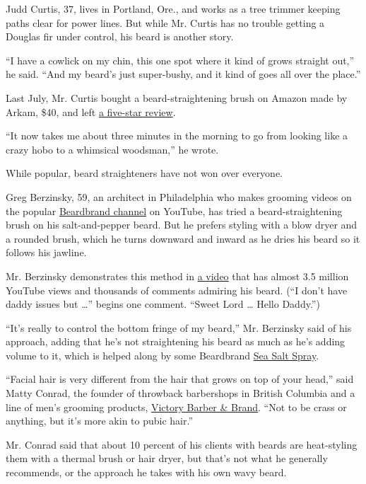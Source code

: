 Judd Curtis, 37, lives in Portland, Ore., and works as a tree trimmer
keeping paths clear for power lines. But while Mr. Curtis has no trouble
getting a Douglas fir under control, his beard is another story.

``I have a cowlick on my chin, this one spot where it kind of grows
straight out,'' he said. ``And my beard's just super-bushy, and it kind
of goes all over the place.''

Last July, Mr. Curtis bought a beard-straightening brush on Amazon made
by Arkam, \$40, and left
\href{https://www.amazon.com/gp/customer-reviews/R37IKYCPAE9X8W/ref=cm_cr_getr_d_rvw_ttl?ie=UTF8\&ASIN=B07Q5C9645}{a
five-star review}.

``It now takes me about three minutes in the morning to go from looking
like a crazy hobo to a whimsical woodsman,'' he wrote.

While popular, beard straighteners have not won over everyone.

Greg Berzinsky, 59, an architect in Philadelphia who makes grooming
videos on the popular
\href{https://www.youtube.com/user/TheBeardbrand/featured}{Beardbrand
channel} on YouTube, has tried a beard-straightening brush on his
salt-and-pepper beard. But he prefers styling with a blow dryer and a
rounded brush, which he turns downward and inward as he dries his beard
so it follows his jawline.

Mr. Berzinsky demonstrates this method in
\href{https://www.youtube.com/watch?v=qu5PxhEUMfU\&t=244s}{a video} that
has almost 3.5 million YouTube views and thousands of comments admiring
his beard. (``I don't have daddy issues but \ldots{}'' begins one
comment. ``Sweet Lord \ldots{} Hello Daddy.'')

``It's really to control the bottom fringe of my beard,'' Mr. Berzinsky
said of his approach, adding that he's not straightening his beard as
much as he's adding volume to it, which is helped along by some
Beardbrand \href{https://www.beardbrand.com/products/sea-salt-spray}{Sea
Salt Spray}.

``Facial hair is very different from the hair that grows on top of your
head,'' said Matty Conrad, the founder of throwback barbershops in
British Columbia and a line of men's grooming products,
\href{https://victorybarber.com/}{Victory Barber \& Brand}. ``Not to be
crass or anything, but it's more akin to pubic hair.''

Mr. Conrad said that about 10 percent of his clients with beards are
heat-styling them with a thermal brush or hair dryer, but that's not
what he generally recommends, or the approach he takes with his own wavy
beard.

